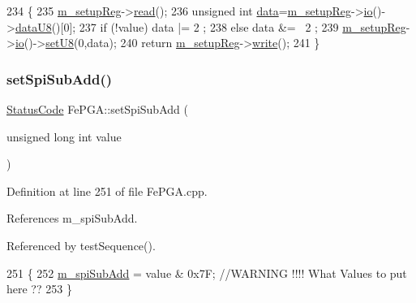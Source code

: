 \begin{DoxyCode}
234                                           \{
235   \hyperlink{classFePGA_a0255fe229013986b4387c3a75ddf4e97}{m\_setupReg}->\hyperlink{classIOobject_aa07610c11963b1db6710e3c76ceea456}{read}();
236   \textcolor{keywordtype}{unsigned} \textcolor{keywordtype}{int} \hyperlink{namespaceshell_a5ea2525995cedc3efd69ea8a7f034d1e}{data}=\hyperlink{classFePGA_a0255fe229013986b4387c3a75ddf4e97}{m\_setupReg}->\hyperlink{classIOobject_af04fb94137c3d86849f478ac5afab5d1}{io}()->\hyperlink{classIOdata_a75e9c318dbac3a39402179070943d4bc}{dataU8}()[0];
237   \textcolor{keywordflow}{if} (!value) data |=  2 ;
238   \textcolor{keywordflow}{else}        data &= ~2 ;
239   \hyperlink{classFePGA_a0255fe229013986b4387c3a75ddf4e97}{m\_setupReg}->\hyperlink{classIOobject_af04fb94137c3d86849f478ac5afab5d1}{io}()->\hyperlink{classIOdata_a6c4fb2f2af01889ada889c2b7aceb24d}{setU8}(0,data);
240   \textcolor{keywordflow}{return} \hyperlink{classFePGA_a0255fe229013986b4387c3a75ddf4e97}{m\_setupReg}->\hyperlink{classIOobject_a9f6984bc9f0fadcf800f1be2523ac744}{write}();
241 \}
\end{DoxyCode}
\mbox{\label{classFePGA_ad0a662adc6070427f0e1962c20a92de6}} 
\subsubsection{\texorpdfstring{set\+Spi\+Sub\+Add()}{setSpiSubAdd()}}
{\footnotesize\ttfamily \hyperlink{classStatusCode}{Status\+Code} Fe\+P\+G\+A\+::set\+Spi\+Sub\+Add (\begin{DoxyParamCaption}\item[{unsigned long int}]{value }\end{DoxyParamCaption})}



Definition at line 251 of file Fe\+P\+G\+A.\+cpp.



References m\+\_\+spi\+Sub\+Add.



Referenced by test\+Sequence().


\begin{DoxyCode}
251                                                        \{
252   \hyperlink{classFePGA_a4f2f5d175aeb6dcaf497f81d2f075411}{m\_spiSubAdd} = value & 0x7F;  \textcolor{comment}{//WARNING !!!! What Values to put here ??}
253 \}
\end{DoxyCode}
\mbox{\label{classObject_a89557dbbad5bcaa02652f5d7fa35d20f}} 
